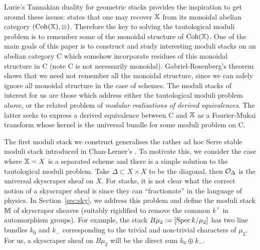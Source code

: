\documentclass[12pt]{amsart}
\begin{document}
Lurie's Tannakian duality for geometric stacks \cite{Lurie} provides the inspiration to get around these issues: \cite[Theorem 5.11]{Lurie} states that one may recover $\mathbb{X}$ from its monoidal abelian category $(\operatorname{Coh}(\mathbb{X}), \otimes)$. Therefore the key to solving the tautological moduli problem is to remember some of the monoidal structure of  $\operatorname{Coh}(\mathbb{X})$. One of the main goals of this paper is to construct and study interesting moduli stacks on an abelian category {\sf C} which somehow incorporate residues of this monoidal structure in {\sf C} (note {\sf C} is not necessarily monoidal). Gabriel-Rosenberg's theorem shows that we need not remember all the monoidal structure, since we can safely ignore all monoidal structure in the case of schemes. The moduli stacks of interest for us are those which address either the tautological moduli problem above, or the related problem of {\em modular realisations of derived equivalences}. The latter seeks to express a derived equivalence between {\sf C} and $\mathbb{X}$ as a Fourier-Mukai transform whose kernel is the universal bundle for some moduli problem on {\sf C}. 


The first moduli stack we construct  generalises the rather ad hoc Serre stable moduli stack introduced in  Chan-Lerner's \cite{CL}. To motivate this, we consider the case where $\mathbb{X}=X$ is a separated scheme and  there is a simple solution to the tautological moduli problem. Take $\Delta \subset X \times X$ to be the diagonal, then $\mathcal{O}_{\Delta}$ is the universal skyscraper sheaf on $X$. For stacks, it is not clear what the correct notion of a skyscraper sheaf is since they can ``fractionate'' in the language of physics. In Section~\ref{sec:sky}, we address this problem and define the moduli stack $\mathbb{M}$ of skyscraper sheaves (suitably rigidified to remove the common $k^{\times}$ in automorphism groups). For example, the stack $B \mu_2 := [\operatorname{Spec} k / \mu_2]$ has two line bundles $k_0$ and $k_-$ corresponding to the trivial and non-trivial characters of $\mu_2$. For us, a skyscraper sheaf on $B\mu_2$ will be the direct sum $k_0 \oplus k_-$. 
\end{document}
